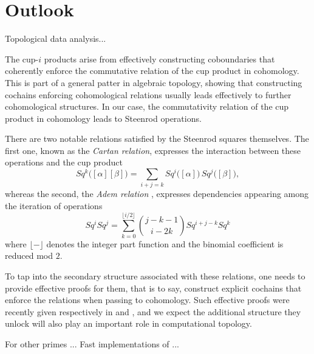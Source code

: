
\section{Outlook} \label{s:outlook}

Topological data analysis...

The cup-$i$ products arise from effectively constructing coboundaries that coherently enforce the commutative relation of the cup product in cohomology.
This is part of a general patter in algebraic topology, showing that constructing cochains enforcing cohomological relations usually leads effectively to further cohomological structures.
In our case, the commutativity relation of the cup product in cohomology leads to Steenrod operations.

There are two notable relations satisfied by the Steenrod squares themselves.
The first one, known as the \textit{Cartan relation}, expresses the interaction between these operations and the cup product
\begin{equation*}
Sq^k \big( [\alpha] [\beta] \big) = \sum_{i+j=k} Sq^i \big([\alpha]\big)\, Sq^j \big([\beta]\big),
\end{equation*}
whereas the second, the \textit{Adem relation} \cite{adem52relations}, expresses dependencies appearing among the iteration of operations
\begin{equation} \label{equation: adem relations}
Sq^i Sq^j = \sum_{k=0}^{\lfloor i/2 \rfloor} {j-k-1 \choose i-2k} Sq^{i+j-k} Sq^k
\end{equation}
where $\lfloor- \rfloor$ denotes the integer part function and the binomial coefficient is reduced mod $2$.

To tap into the secondary structure associated with these relations, one needs to provide effective proofs for them, that is to say, construct explicit cochains that enforce the relations when passing to cohomology.
Such effective proofs were recently given respectively in \cite{medina2020cartan} and \cite{medina2020adem}, and we expect the additional structure they unlock will also play an important role in computational topology.

For other primes ... Fast implementations of \cite{medina2020odd} ...